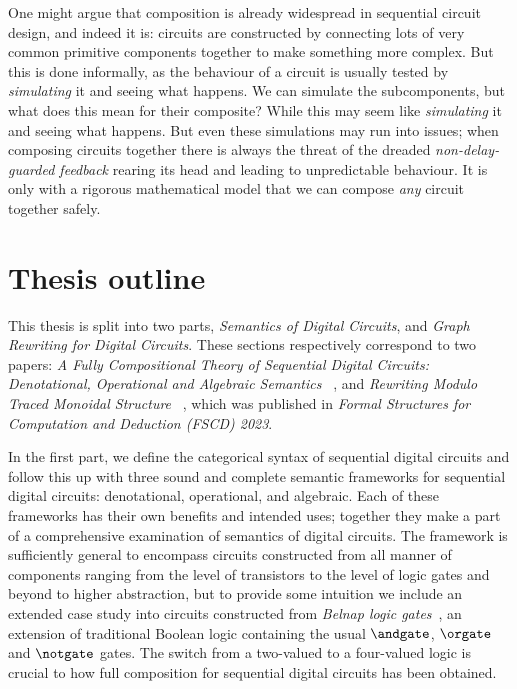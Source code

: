One might argue that composition is already widespread in sequential circuit
design, and indeed it is: circuits are constructed by connecting lots of very
common primitive components together to make something more complex.
But this is done informally, as the behaviour of a circuit is usually tested
by \emph{simulating} it and seeing what happens.
We can simulate the subcomponents, but what does this mean for their composite?
While this may seem like
\emph{simulating} it and seeing what happens.
But even these simulations may run into issues; when composing circuits together
there is always the threat of the dreaded \emph{non-delay-guarded feedback}
rearing its head and leading to unpredictable behaviour.
It is only with a rigorous mathematical model that we can compose \emph{any}
circuit together safely.

\section{Thesis outline}

This thesis is split into two parts, \emph{Semantics of Digital Circuits}, and
\emph{Graph Rewriting for Digital Circuits}.
These sections respectively correspond to two papers:
\emph{%
    A Fully Compositional Theory of Sequential Digital Circuits:
    Denotational, Operational and Algebraic Semantics%
}~\cite{ghica2024fully}, and \emph{%
    Rewriting Modulo Traced Monoidal Structure%
}~\cite{ghica2023rewriting}, which was published in
\emph{Formal Structures for Computation and Deduction (FSCD) 2023}.

In the first part, we define the categorical syntax of sequential digital
circuits and follow this up with three sound and complete semantic frameworks
for sequential digital circuits: denotational, operational, and algebraic.
Each of these frameworks has their own benefits and intended uses; together they
make a part of a comprehensive examination of semantics of digital circuits.
The framework is sufficiently general to encompass circuits constructed from
all manner of components ranging from the level of transistors to the level of
logic gates and beyond to higher abstraction, but to provide some intuition we
include an extended case study into circuits constructed from
\emph{Belnap logic gates}~\cite{belnap1977useful}, an extension of traditional
Boolean logic containing the usual \(\andgate\), \(\orgate\) and \(\notgate\)
gates.
The switch from a two-valued to a four-valued logic is crucial to how full
composition for sequential digital circuits has been obtained.

